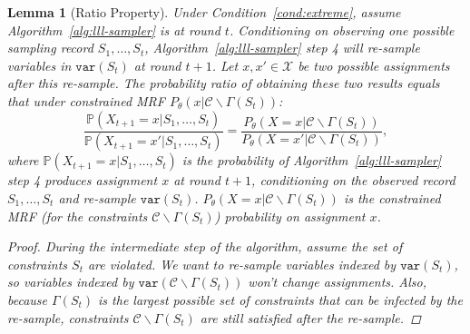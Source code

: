 \documentclass[letterpaper]{article} %
\newtheorem{lemma}{Lemma}
\newcommand{\var}{\mathtt{var}}
\newcommand{\p}{\mathbb{P}}
\begin{document}
\begin{lemma}[Ratio Property] \label{lem:ratio-prob}
Under Condition~\ref{cond:extreme}, assume Algorithm~\ref{alg:lll-sampler} is at round $t$. Conditioning on observing one possible sampling record $S_1,\ldots,S_t$, Algorithm~\ref{alg:lll-sampler} step 4 will re-sample variables in $\var(S_t)$ at round $t+1$. Let $x,x'\in\mathcal{X}$ be two possible assignments after this re-sample.  The probability ratio  of obtaining these two results equals that under constrained MRF
$P_{\theta}(x|\mathcal{C}\backslash \Gamma(S_t))$:
\begin{equation} \label{eq:ratio}
\frac{\p(X_{t+1}= x |S_1,\ldots, S_t)}{\p(X_{t+1}= x'|S_1,\ldots, S_t)} = \frac{P_{\theta}(X = x |\mathcal{C}\backslash \Gamma(S_t))}{P_{\theta}(X = x'|\mathcal{C}\backslash \Gamma(S_t))},
\end{equation} 
where $\p(X_{t+1}= x |S_1,\ldots, S_t)$ is the probability of Algorithm~\ref{alg:lll-sampler} step 4 produces assignment $x$ at round $t+1$, conditioning on the observed record $S_1,\ldots, S_t$ and re-sample $\var(S_t)$. $P_{\theta}(X = x |\mathcal{C}\backslash \Gamma(S_t))$ is the constrained MRF (for the constraints  $\mathcal{C}\backslash \Gamma(S_t)$) probability on assignment $x$.
\begin{proof}
During the intermediate step of the algorithm, assume the set of constraints $S_t$ are violated. We want to re-sample variables indexed by $\var(S_t)$, so  variables indexed by $\var(\mathcal{C}\backslash\Gamma(S_t))$ won't change assignments. Also, because $\Gamma(S_t)$ is the largest possible set of constraints that can be infected by the re-sample, constraints $\mathcal{C}\backslash \Gamma(S_t)$ are still satisfied after the re-sample. 


\end{proof}
\end{lemma}
\end{document}
